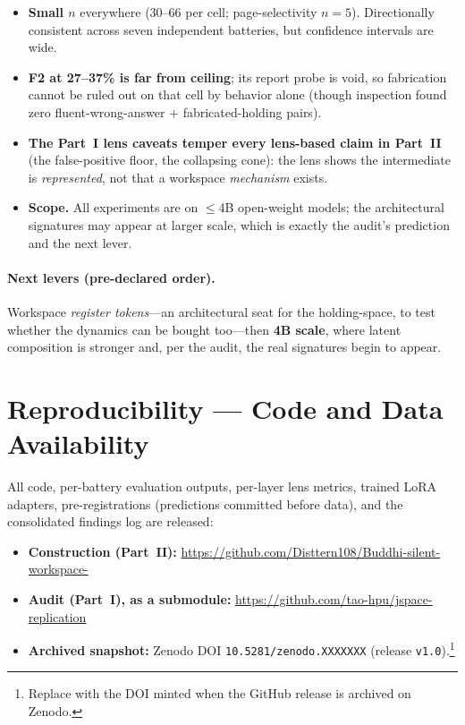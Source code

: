 \documentclass[11pt]{article}
\begin{document}
\begin{itemize}[leftmargin=1.4em,itemsep=2pt]
\item \textbf{Small $n$} everywhere (30--66 per cell; page-selectivity $n{=}5$).
Directionally consistent across seven independent batteries, but confidence
intervals are wide.
\item \textbf{F2 at 27--37\% is far from ceiling}; its report probe is void, so
fabrication cannot be ruled out on that cell by behavior alone (though inspection
found zero fluent-wrong-answer + fabricated-holding pairs).
\item \textbf{The Part~I lens caveats temper every lens-based claim in Part~II}
(the false-positive floor, the collapsing cone): the lens shows the intermediate
is \emph{represented}, not that a workspace \emph{mechanism} exists.
\item \textbf{Scope.} All experiments are on $\leq$4B open-weight models; the
architectural signatures may appear at larger scale, which is exactly the audit's
prediction and the next lever.
\end{itemize}

\paragraph{Next levers (pre-declared order).} Workspace \emph{register
tokens}---an architectural seat for the holding-space, to test whether the
dynamics can be bought too---then \textbf{4B scale}, where latent composition is
stronger and, per the audit, the real signatures begin to appear.

\section*{Reproducibility --- Code and Data Availability}

All code, per-battery evaluation outputs, per-layer lens metrics, trained LoRA
adapters, pre-registrations (predictions committed before data), and the
consolidated findings log are released:

\begin{itemize}[leftmargin=1.4em,itemsep=1pt]
\item \textbf{Construction (Part~II):}
\url{https://github.com/Disttern108/Buddhi-silent-workspace-}
\item \textbf{Audit (Part~I), as a submodule:}
\url{https://github.com/tao-hpu/jspace-replication}
\item \textbf{Archived snapshot:} Zenodo DOI \texttt{10.5281/zenodo.XXXXXXX}
(release \texttt{v1.0}).\footnote{Replace with the DOI minted when the GitHub
release is archived on Zenodo.}
\end{itemize}
\end{document}
